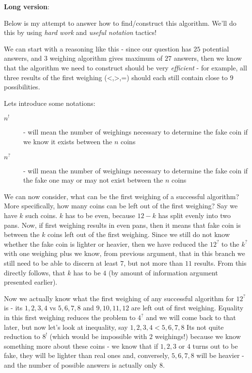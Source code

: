 \begin{problem}
\textbf{Long version}:

Below is my attempt to answer how to find/construct this algorithm. We'll do this by using \textit{hard work} and \textit{useful notation} tactics! 

We can start with a reasoning like this - since our question has $25$ potential answers, and $3$ weighing algorithm gives maximum of $27$ answers, then we know that the algorithm we need to construct should be very \textit{efficient} - for example, all three results of the first weighing (<,>,=) should each still contain close to $9$ possibilities.  

Lets introduce some notations:
\begin{description}
\item[$n^!$] - will mean the number of weighings necessary to determine the fake coin if we know it exists between the $n$ coins
\item[$n^?$] - will mean the number of weighings necessary to determine the fake coin if the fake one may or may not exist between the $n$ coins
\end{description}

We can now consider, what can be the first weighing of a successful algorithm? More specifically, how many coins can be left out of the first weighing? Say we have $k$ such coins. $k$ has to be even, because $12-k$ has split evenly into two pans.  
Now, if first weighing results in even pans, then it means that fake coin is between the $k$ coins left out of the first weighing. Since we still do not know whether the fake coin is lighter or heavier, then we have 
	reduced the $12^?$ to the $k^?$ with one weighing plus we know, from previous argument, that in this branch we still need to be able to discern at least $7$, but not more than $11$ results. From this directly follows, that $k$ has to be $4$ (by amount of information argument presented earlier).
	
Now we actually know what the first weighing of any successful algorithm for $12^?$ is - its $1,2,3,4$ vs $5,6,7,8$ and $9,10,11,12$ are left out of first weighing. Equality in this first weighing reduces the problem to $4^?$ and we will come back to that later, but now let's look at inequality, say $1,2,3,4<5,6,7,8$ 
Its not quite reduction to $8^!$ (which would be impossible with $2$ weighings!) because we know something more about these coins - we know that if $1,2,3$ or $4$ turns out to be fake, they will be lighter than real ones and, conversely, $5,6,7,8$ will be heavier - and the number of possible answers is actually only $8$.


\end{problem}
